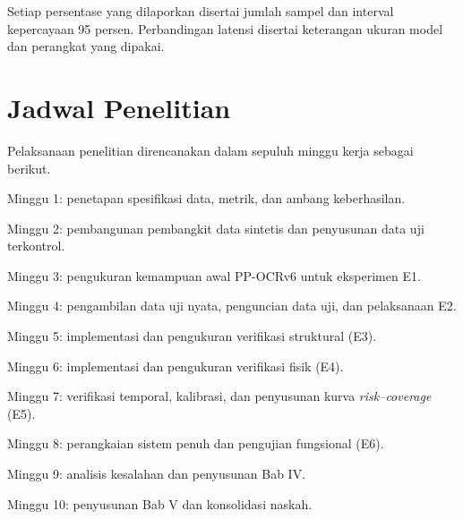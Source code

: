 Setiap persentase yang dilaporkan disertai jumlah sampel dan interval
kepercayaan 95 persen. Perbandingan latensi disertai keterangan ukuran model dan
perangkat yang dipakai.

\section{Jadwal Penelitian}

Pelaksanaan penelitian direncanakan dalam sepuluh minggu kerja sebagai berikut.
\begin{poin}
  \item Minggu 1: penetapan spesifikasi data, metrik, dan ambang keberhasilan.
  \item Minggu 2: pembangunan pembangkit data sintetis dan penyusunan data uji
        terkontrol.
  \item Minggu 3: pengukuran kemampuan awal PP-OCRv6 untuk eksperimen E1.
  \item Minggu 4: pengambilan data uji nyata, penguncian data uji, dan
        pelaksanaan E2.
  \item Minggu 5: implementasi dan pengukuran verifikasi struktural (E3).
  \item Minggu 6: implementasi dan pengukuran verifikasi fisik (E4).
  \item Minggu 7: verifikasi temporal, kalibrasi, dan penyusunan kurva
        \textit{risk--coverage} (E5).
  \item Minggu 8: perangkaian sistem penuh dan pengujian fungsional (E6).
  \item Minggu 9: analisis kesalahan dan penyusunan Bab IV.
  \item Minggu 10: penyusunan Bab V dan konsolidasi naskah.
\end{poin}
